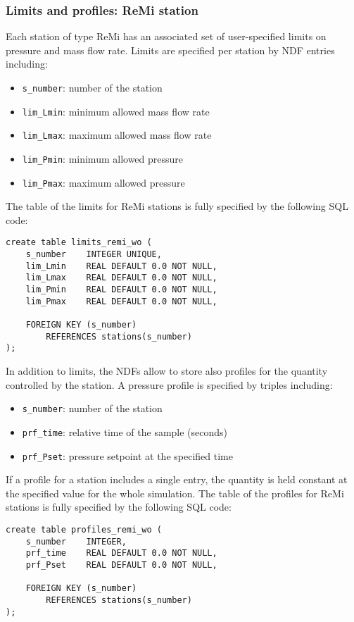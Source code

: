 \subsubsection{Limits and profiles: ReMi station}
Each station of type ReMi has an associated set of user-specified limits on pressure
and mass flow rate. Limits are specified per station by NDF entries including:
\begin{itemize}
    \item \texttt{s\_number}:   number of the station
    \item \texttt{lim\_Lmin}:   minimum allowed mass flow rate
    \item \texttt{lim\_Lmax}:   maximum allowed mass flow rate
    \item \texttt{lim\_Pmin}:   minimum allowed pressure
    \item \texttt{lim\_Pmax}:   maximum allowed pressure
\end{itemize}
The table of the limits for ReMi stations is fully specified by the following SQL code:
\begin{verbatim}
create table limits_remi_wo (
    s_number    INTEGER UNIQUE,
    lim_Lmin    REAL DEFAULT 0.0 NOT NULL,
    lim_Lmax    REAL DEFAULT 0.0 NOT NULL,
    lim_Pmin    REAL DEFAULT 0.0 NOT NULL,
    lim_Pmax    REAL DEFAULT 0.0 NOT NULL,

    FOREIGN KEY (s_number)
        REFERENCES stations(s_number)
);
\end{verbatim}
In addition to limits, the NDFs allow to store also profiles for the quantity
controlled by the station. A pressure profile is specified by triples including:
\begin{itemize}
    \item \texttt{s\_number}:   number of the station
    \item \texttt{prf\_time}:   relative time of the sample (seconds)
    \item \texttt{prf\_Pset}:   pressure setpoint at the specified time
\end{itemize}
If a profile for a station includes a single entry, the quantity is held constant
at the specified value for the whole simulation. The table of the profiles for
ReMi stations is fully specified by the following SQL code:
\begin{verbatim}
create table profiles_remi_wo (
    s_number    INTEGER,
    prf_time    REAL DEFAULT 0.0 NOT NULL,
    prf_Pset    REAL DEFAULT 0.0 NOT NULL,

    FOREIGN KEY (s_number)
        REFERENCES stations(s_number)
);
\end{verbatim}

